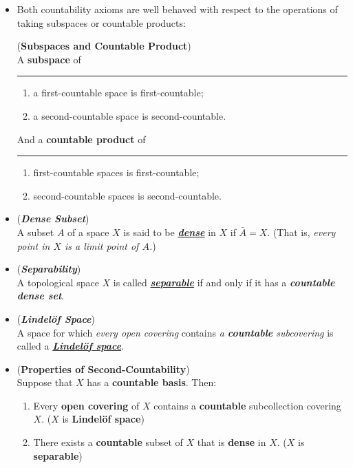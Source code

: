 \documentclass[11pt]{article}
\begin{document}
\begin{itemize}
\item Both countability axioms are well behaved with respect to the operations of taking subspaces or countable products:
\begin{proposition}(\textbf{Subspaces and Countable Product}) \citep{munkres2000topology}\\
A \textbf{subspace} of \rule{1cm}{0.0001mm}
\begin{enumerate}
\item a first-countable space is first-countable;
\item a second-countable space is second-countable.
\end{enumerate}
And a \textbf{countable product} of \rule{1cm}{0.0001mm}
\begin{enumerate}
\item first-countable spaces is first-countable;
\item second-countable spaces is second-countable.
\end{enumerate}
\end{proposition}

\item \begin{definition} (\emph{\textbf{Dense Subset}})\\
A subset $A$ of a space $X$ is said to be \underline{\emph{\textbf{dense}}} in $X$ if $\bar{A}=X$. (That is, \emph{every point in $X$ is a limit point of $A$.})
\end{definition}

\item \begin{definition} (\emph{\textbf{Separability}})\\
A topological space $X$ is called \underline{\emph{\textbf{separable}}} if and only if it has a \emph{\textbf{countable dense set}}.
\end{definition}

\item \begin{definition} (\emph{\textbf{Lindel{\"o}f Space}})\\
A space for which \emph{every open covering} contains \emph{a \textbf{countable} subcovering} is called a \underline{\emph{\textbf{Lindel{\"o}f space}}}. 
\end{definition}

\item \begin{proposition} (\textbf{Properties of Second-Countability}) \citep{munkres2000topology}\\
Suppose that $X$ has a \textbf{countable basis}. Then:
\begin{enumerate}
\item Every \textbf{open covering} of $X$ contains a \textbf{countable} subcollection covering $X$. ($X$ is \textbf{Lindel{\"o}f space})
\item There exists a \textbf{countable} subset of $X$ that is \textbf{dense} in $X$. ($X$ is \textbf{separable})
\end{enumerate}
\end{proposition}


\end{itemize}
\end{document}
